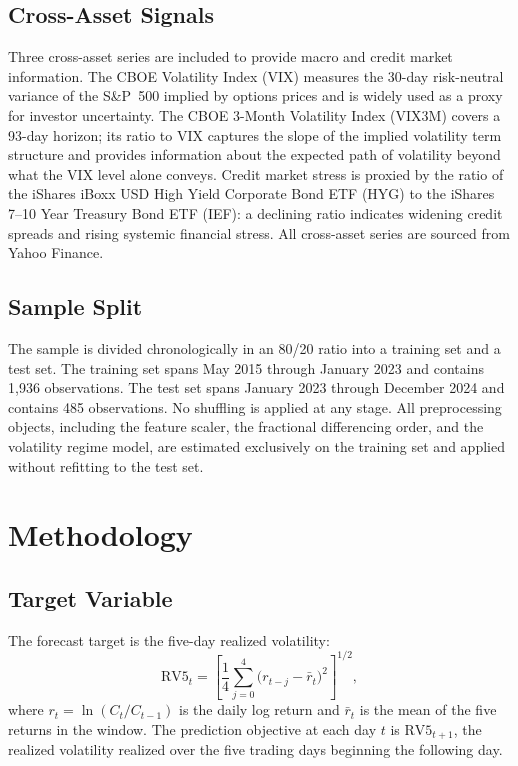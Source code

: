 \documentclass[12pt]{article}
\begin{document}
\subsection*{Cross-Asset Signals}

Three cross-asset series are included to provide macro and credit market
information.  The CBOE Volatility Index (VIX) measures the 30-day
risk-neutral variance of the S\&P~500 implied by options prices and is widely
used as a proxy for investor uncertainty.  The CBOE 3-Month Volatility Index
(VIX3M) covers a 93-day horizon; its ratio to VIX captures the slope of the
implied volatility term structure and provides information about the expected
path of volatility beyond what the VIX level alone conveys.  Credit market
stress is proxied by the ratio of the iShares iBoxx USD High Yield Corporate
Bond ETF (HYG) to the iShares 7--10 Year Treasury Bond ETF (IEF): a declining
ratio indicates widening credit spreads and rising systemic financial stress.
All cross-asset series are sourced from Yahoo Finance.

\subsection*{Sample Split}

The sample is divided chronologically in an 80/20 ratio into a training set
and a test set.  The training set spans May 2015 through January 2023 and
contains 1,936 observations.  The test set spans January 2023 through December
2024 and contains 485 observations.  No shuffling is applied at any stage.
All preprocessing objects, including the feature scaler, the fractional
differencing order, and the volatility regime model, are estimated exclusively
on the training set and applied without refitting to the test set.


\section{Methodology}
\label{sec:method}

\subsection{Target Variable}

The forecast target is the five-day realized volatility:
\begin{equation}
  \text{RV5}_{t} = \left[\frac{1}{4}\sum_{j=0}^{4}
    \bigl(r_{t-j} - \bar{r}_{t}\bigr)^{2}\right]^{1/2},
  \label{eq:rv5}
\end{equation}
where $r_{t} = \ln(C_{t}/C_{t-1})$ is the daily log return and
$\bar{r}_{t}$ is the mean of the five returns in the window.  The prediction
objective at each day $t$ is $\text{RV5}_{t+1}$, the realized volatility
realized over the five trading days beginning the following day.
\end{document}
